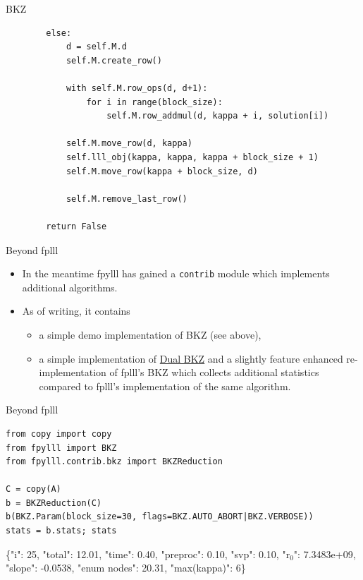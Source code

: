 \documentclass[presentation,smaller]{beamer}
\begin{document}
\begin{frame}[fragile,label={sec:orgheadline22}]{BKZ}
 \lstset{language=Python,label= ,caption= ,captionpos=b,numbers=none}
\begin{lstlisting}
        else:
            d = self.M.d
            self.M.create_row()

            with self.M.row_ops(d, d+1):
                for i in range(block_size):
                    self.M.row_addmul(d, kappa + i, solution[i])

            self.M.move_row(d, kappa)
            self.lll_obj(kappa, kappa, kappa + block_size + 1)
            self.M.move_row(kappa + block_size, d)

            self.M.remove_last_row()

        return False
\end{lstlisting}
\end{frame}

\begin{frame}[fragile,label={sec:orgheadline23}]{Beyond fplll}
 \begin{itemize}
\item In the meantime \alert{fpylll} has gained a \texttt{contrib} module which implements additional algorithms.
\item As of writing, it contains
\begin{itemize}
\item a simple demo implementation of BKZ (see above),
\item a simple implementation of \href{http://ia.cr/2015/1123}{Dual BKZ} and a slightly feature enhanced re-implementation of fplll’s BKZ which collects additional statistics compared to fplll’s implementation of the same algorithm.
\end{itemize}
\end{itemize}
\end{frame}

\begin{frame}[fragile,label={sec:orgheadline24}]{Beyond fplll}
 \lstset{language=Python,label= ,caption= ,captionpos=b,numbers=none}
\begin{lstlisting}
from copy import copy
from fpylll import BKZ
from fpylll.contrib.bkz import BKZReduction

C = copy(A)
b = BKZReduction(C)
b(BKZ.Param(block_size=30, flags=BKZ.AUTO_ABORT|BKZ.VERBOSE))
stats = b.stats; stats
\end{lstlisting}

\{"i":  25,  "total":     12.01,  "time":     0.40,  "preproc":     0.10,  "svp":     0.10,  "r\(_{\text{0}}\)": 7.3483e+09,  "slope": -0.0538,  "enum nodes": 20.31,  "max(kappa)":   6\}
\end{frame}
\end{document}
